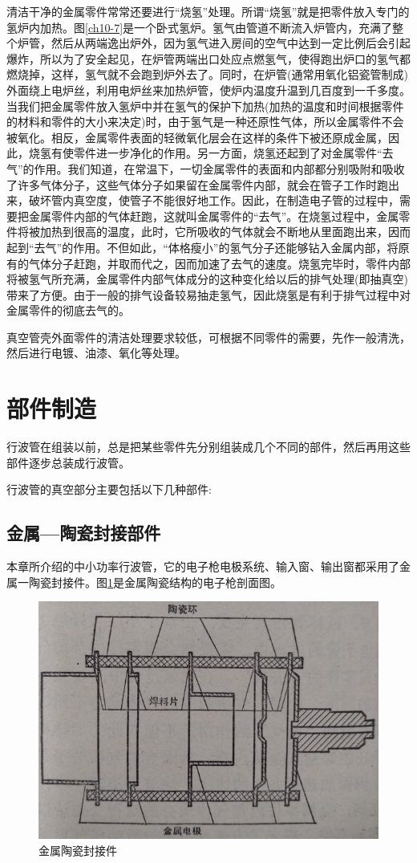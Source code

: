 清洁干净的金属零件常常还要进行“烧氢”处理。所谓“烧氢”就是把零件放入专门的氢炉内加热。图\ref{ch10-7}是一个卧式氢炉。氢气由管道不断流入炉管内，充满了整个炉管，然后从两端逸出炉外，因为氢气进入房间的空气中达到一定比例后会引起爆炸，所以为了安全起见，在炉管两端出口处应点燃氢气，使得跑出炉口的氢气都燃烧掉，这样，氢气就不会跑到炉外去了。同时，在炉管(通常用氧化铝瓷管制成)外面绕上电炉丝，利用电炉丝来加热炉管，使炉内温度升温到几百度到一千多度。当我们把金属零件放入氢炉中并在氢气的保护下加热(加热的温度和时间根据零件的材料和零件的大小来决定)时，由于氢气是一种还原性气体，所以金属零件不会被氧化。相反，金属零件表面的轻微氧化层会在这样的条件下被还原成金属，因此，烧氢有使零件进一步净化的作用。另一方面，烧氢还起到了对金属零件“去气”的作用。我们知道，在常温下，一切金属零件的表面和内部都分别吸附和吸收了许多气体分子，这些气体分子如果留在金属零件内部，就会在管子工作时跑出来，破坏管内真空度，使管子不能很好地工作。因此，在制造电子管的过程中，需要把金属零件内部的气体赶跑，这就叫金属零件的“去气”。在烧氢过程中，金属零件将被加热到很高的温度，此时，它所吸收的气体就会不断地从里面跑出来，因而起到“去气”的作用。不但如此，“体格瘦小”的氢气分子还能够钻入金属内部，将原有的气体分子赶跑，并取而代之，因而加速了去气的速度。烧氢完毕时，零件内部将被氢气所充满，金属零件内部气体成分的这种变化给以后的排气处理(即抽真空)带来了方便。由于一般的排气设备较易抽走氢气，因此烧氢是有利于排气过程中对金属零件的彻底去气的。

真空管壳外面零件的清洁处理要求较低，可根据不同零件的需要，先作一般清洗，然后进行电镀、油漆、氧化等处理。
\section{部件制造}
行波管在组装以前，总是把某些零件先分别组装成几个不同的部件，然后再用这些部件逐步总装成行波管。


行波管的真空部分主要包括以下几种部件:


\subsection{金属—陶瓷封接部件}


本章所介绍的中小功率行波管，它的电子枪电极系统、输入窗、输出窗都采用了金属一陶瓷封接件。图\ref{ch10-8}是金属陶瓷结构的电子枪剖面图。
\begin{figure}[phtb]
	\centering
	\includegraphics[width=0.75\linewidth]{figure/ch10-8}
	\caption{ 金属陶瓷封接件}
	\label{ch10-8}
\end{figure}



